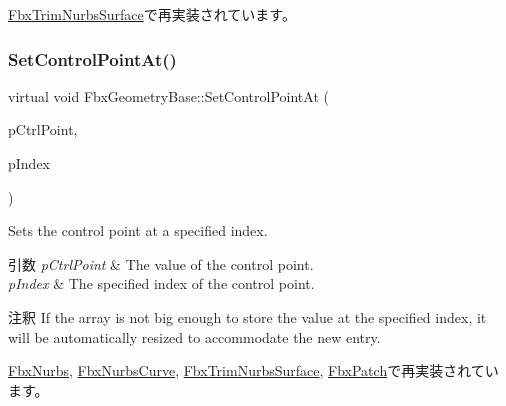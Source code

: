 \hyperlink{class_fbx_trim_nurbs_surface_a8a42014521b0c91eba3554ecafe56814}{Fbx\+Trim\+Nurbs\+Surface}で再実装されています。

\mbox{\label{class_fbx_geometry_base_ab2d5567b073e6b9f4feb5bb428fa99e4}} 
\subsubsection{\texorpdfstring{Set\+Control\+Point\+At()}{SetControlPointAt()}\hspace{0.1cm}{\footnotesize\ttfamily [2/2]}}
{\footnotesize\ttfamily virtual void Fbx\+Geometry\+Base\+::\+Set\+Control\+Point\+At (\begin{DoxyParamCaption}\item[{const \hyperlink{class_fbx_vector4}{Fbx\+Vector4} \&}]{p\+Ctrl\+Point,  }\item[{int}]{p\+Index }\end{DoxyParamCaption})\hspace{0.3cm}{\ttfamily [virtual]}}

Sets the control point at a specified index. 
\begin{DoxyParams}{引数}
{\em p\+Ctrl\+Point} & The value of the control point. \\
\hline
{\em p\+Index} & The specified index of the control point.\\
\hline
\end{DoxyParams}
\begin{DoxyRemark}{注釈}
If the array is not big enough to store the value at the specified index, it will be automatically resized to accommodate the new entry. 
\end{DoxyRemark}


\hyperlink{class_fbx_nurbs_a46f56bfb4c6ffc90b79b2e0b81c89880}{Fbx\+Nurbs}, \hyperlink{class_fbx_nurbs_curve_a7313bcfe1a7b6d566f30e5395bf89877}{Fbx\+Nurbs\+Curve}, \hyperlink{class_fbx_trim_nurbs_surface_acec735094f0448ab58a48baf38c0c7ef}{Fbx\+Trim\+Nurbs\+Surface}, \hyperlink{class_fbx_patch_a43bd49dba561cff8f166b8f7a12816f6}{Fbx\+Patch}で再実装されています。

\mbox{\label{class_fbx_geometry_base_aea3fc519575d88c430221b0e74040b0c}} 
